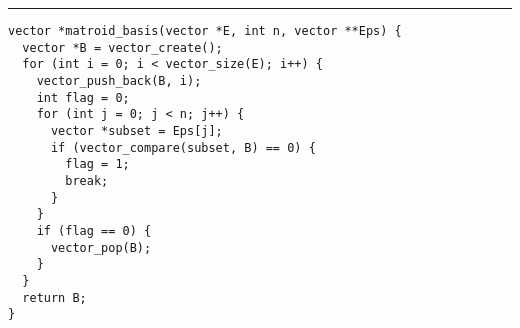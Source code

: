 \documentclass{article}
\begin{document}
\lstset{language = C,
    extendedchars = \true,
    keepspaces = true,
    breaklines=true,
    frame=lines}
\hrule
\begin{lstlisting}[title=\textbf {Алгоритм 2.2} Жадный алгоритм]
vector *matroid_basis(vector *E, int n, vector **Eps) {
  vector *B = vector_create();
  for (int i = 0; i < vector_size(E); i++) {
    vector_push_back(B, i);
    int flag = 0;
    for (int j = 0; j < n; j++) {
      vector *subset = Eps[j];
      if (vector_compare(subset, B) == 0) {
        flag = 1;
        break;
      }
    }
    if (flag == 0) {
      vector_pop(B);
    }
  }
  return B;
}
\end{lstlisting}
\end{document}
